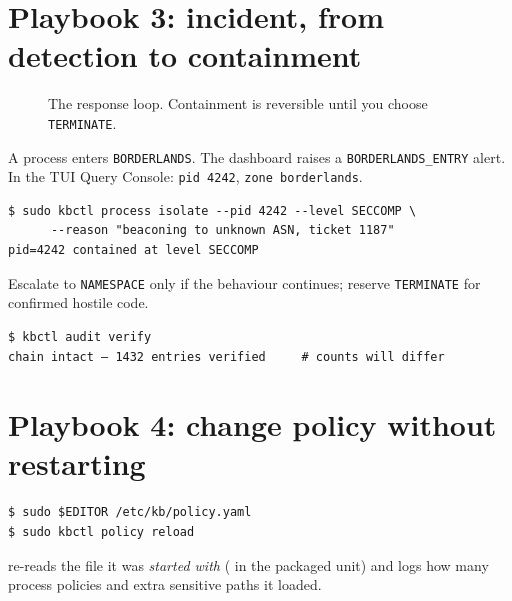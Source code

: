 \section{Playbook 3: incident, from detection to containment}
\begin{figure}[ht]
\centering
{}
\caption{The response loop. Containment is reversible until you choose \texttt{TERMINATE}.}
\end{figure}
\resetsteps
{} A process enters \texttt{BORDERLANDS}. The dashboard raises a \texttt{BORDERLANDS\_ENTRY} alert.
 In the TUI Query Console: \texttt{pid 4242}, \texttt{zone borderlands}.
\begin{lstlisting}[style=console]
$ sudo kbctl process isolate --pid 4242 --level SECCOMP \
      --reason "beaconing to unknown ASN, ticket 1187"
pid=4242 contained at level SECCOMP
\end{lstlisting}
Escalate to \texttt{NAMESPACE} only if the behaviour continues; reserve \texttt{TERMINATE} for confirmed hostile code.
\step{Verify the record.}
\begin{lstlisting}[style=console]
$ kbctl audit verify
chain intact — 1432 entries verified     # counts will differ
\end{lstlisting}

\section{Playbook 4: change policy without restarting}
\label{sec:policy-change}
\begin{lstlisting}[style=console]
$ sudo $EDITOR /etc/kb/policy.yaml
$ sudo kbctl policy reload
\end{lstlisting}
 re-reads the file it was \emph{started with} ( in the packaged unit) and
logs how many process policies and extra sensitive paths it loaded.

